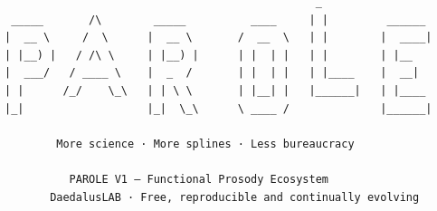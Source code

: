 \begin{center}
\ttfamily
\noindent
\begin{verbatim}
                                                _
 _____       /\        _____          ____     | |         ______
|  __ \     /  \      |  __ \       /  __  \   | |        |  ____|
| |__) |   / /\ \     | |__) |      | |  | |   | |        | |__   
|  ___/   / ____ \    |  _  /       | |  | |   | |____    |  __|  
| |      /_/    \_\   | | \ \       | |__| |   |______|   | |____ 
|_|                   |_|  \_\      \ ____ /              |______|

        More science · More splines · Less bureaucracy

          PAROLE V1 — Functional Prosody Ecosystem
       DaedalusLAB · Free, reproducible and continually evolving
\end{verbatim}
\end{center}
